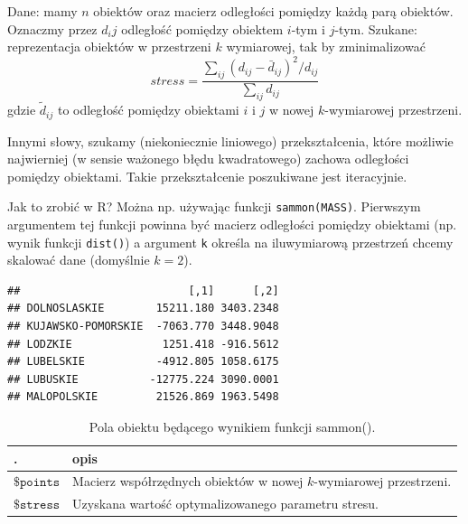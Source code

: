 \documentclass[polish,]{book}
\newenvironment{Shaded}{\begin{snugshade}}{\end{snugshade}}
\newcommand{\CommentTok}[1]{\textcolor[rgb]{0.56,0.35,0.01}{\textit{#1}}}
\newcommand{\DataTypeTok}[1]{\textcolor[rgb]{0.13,0.29,0.53}{#1}}
\newcommand{\DecValTok}[1]{\textcolor[rgb]{0.00,0.00,0.81}{#1}}
\newcommand{\KeywordTok}[1]{\textcolor[rgb]{0.13,0.29,0.53}{\textbf{#1}}}
\newcommand{\NormalTok}[1]{#1}
\newcommand{\OperatorTok}[1]{\textcolor[rgb]{0.81,0.36,0.00}{\textbf{#1}}}
\newcommand{\OtherTok}[1]{\textcolor[rgb]{0.56,0.35,0.01}{#1}}
\newcommand{\StringTok}[1]{\textcolor[rgb]{0.31,0.60,0.02}{#1}}
\begin{document}
Dane: mamy \(n\) obiektów oraz macierz odległości pomiędzy każdą parą obiektów.
Oznaczmy przez \(d_ij\) odległość pomiędzy obiektem \(i\)-tym i \(j\)-tym.
Szukane: reprezentacja obiektów w przestrzeni \(k\) wymiarowej, tak by zminimalizować
\[
stress=\frac{\sum_{ij}(d_{ij}-\bar{d}_{ij})^2/d_{ij}}{\sum_{ij}d_{ij}}
\]
gdzie \(\tilde{d}_{ij}\) to odległość pomiędzy obiektami \(i\) i \(j\) w nowej \(k\)-wymiarowej przestrzeni.

Innymi słowy, szukamy (niekoniecznie liniowego) przekształcenia, które możliwie
najwierniej (w sensie ważonego błędu kwadratowego) zachowa odległości pomiędzy
obiektami. Takie przekształcenie poszukiwane jest iteracyjnie.

Jak to zrobić w R? Można np. używając funkcji \texttt{sammon(MASS)}. Pierwszym argumentem tej funkcji powinna być macierz odległości pomiędzy obiektami (np. wynik
funkcji \texttt{dist()}) a argument \texttt{k} określa na iluwymiarową przestrzeń chcemy skalować dane (domyślnie \(k = 2\)).

\begin{Shaded}
\end{Shaded}

\begin{verbatim}
##                          [,1]      [,2]
## DOLNOSLASKIE        15211.180 3403.2348
## KUJAWSKO-POMORSKIE  -7063.770 3448.9048
## LODZKIE              1251.418 -916.5612
## LUBELSKIE           -4912.805 1058.6175
## LUBUSKIE           -12775.224 3090.0001
## MALOPOLSKIE         21526.869 1963.5498
\end{verbatim}

\begin{table}[t]

\caption{\label{tab:tab22}Pola obiektu będącego wynikiem funkcji sammon().}
\centering
\begin{tabular}{>{}l||>{\raggedright\arraybackslash}p{35em}}
\hline
. & opis\\
\hline
$\texttt{\$points}$ & Macierz współrzędnych obiektów w nowej $k$-wymiarowej przestrzeni.\\
\hline
$\texttt{\$stress}$ & Uzyskana wartość optymalizowanego parametru stresu.\\
\hline
\end{tabular}
\end{table}
\end{document}
